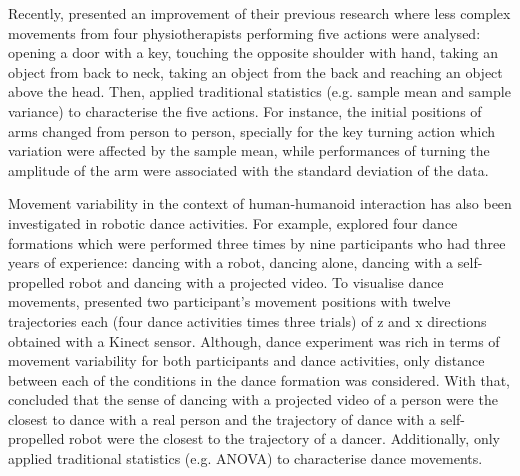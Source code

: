 Recently, \cite{guneysu2015} presented an improvement of their previous research
where less complex movements from four physiotherapists performing five actions 
were analysed: opening a door with a key, 
touching the opposite shoulder with hand, taking an object from back to neck, 
taking an object from the back and reaching an object above the head.
Then, \citealt[p. 252]{guneysu2015} applied traditional statistics 
(e.g. sample mean and sample variance) to characterise the five actions.
For instance, the  initial positions of arms changed from person to person, 
specially for the key turning action which variation were affected by the 
sample mean, while performances of turning the amplitude of the arm
were associated with the standard deviation of the data.


Movement variability in the context of human-humanoid interaction has also been
investigated in robotic dance activities.
For example, \cite{tsuchida2013} explored four dance formations which were 
performed three times by nine participants who had three years of experience: 
dancing with a robot, dancing alone, dancing with a self-propelled robot and 
dancing with a projected video.
To visualise dance movements, \cite{tsuchida2013} presented two participant's 
movement positions with twelve trajectories each (four dance activities times 
three trials) of z and x directions obtained with a Kinect sensor.
Although, dance experiment was rich in terms of movement variability
for both participants and dance activities, only distance between each of 
the conditions in the dance formation was considered. 
With that, \cite{tsuchida2013} concluded that the sense of dancing with a 
projected video of a person were the closest to dance with a real person and 
the trajectory of dance with a self-propelled robot were the closest 
to the trajectory of a dancer. Additionally, \cite{tsuchida2013} only applied 
traditional statistics (e.g. ANOVA) to characterise dance movements.






